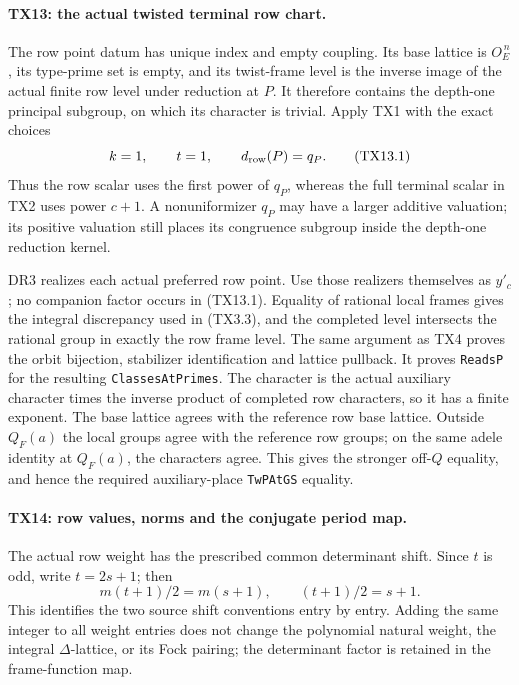 \paragraph{TX13: the actual twisted terminal row chart.}
The row point datum has unique index and empty coupling.
Its base lattice is \(O_E^{\,n}\), its type-prime set is empty,
and its twist-frame level is the inverse image of the actual
finite row level under reduction at \(P\). It therefore
contains the depth-one principal subgroup, on which its
character is trivial. Apply TX1 with the exact choices
\[
 k=1,\qquad t=1,\qquad d_{\rm row}(P)=q_P.
 \tag{TX13.1}
\]
Thus the row scalar uses the first power of \(q_P\), whereas
the full terminal scalar in TX2 uses power \(c+1\). A
nonuniformizer \(q_P\) may have a larger additive valuation;
its positive valuation still places its congruence subgroup
inside the depth-one reduction kernel.

DR3 realizes each actual preferred row point. Use those
realizers themselves as \(y'_c\); no companion factor occurs
in (TX13.1). Equality of rational local frames gives the
integral discrepancy used in (TX3.3), and the completed level
intersects the rational group in exactly the row frame level.
The same argument as TX4 proves the orbit bijection,
stabilizer identification and lattice pullback. It proves
\texttt{ReadsP} for the resulting \texttt{ClassesAtPrimes}.
The character is the actual auxiliary character times the
inverse product of completed row characters, so it has a
finite exponent. The base lattice agrees with the reference
row base lattice. Outside \(Q_F(a)\) the local groups agree
with the reference row groups; on the same adele identity at
\(Q_F(a)\), the characters agree. This gives the stronger
off-\(Q\) equality, and hence the required auxiliary-place
\texttt{TwPAtGS} equality.

\paragraph{TX14: row values, norms and the conjugate period map.}
The actual row weight has the prescribed common determinant
shift. Since \(t\) is odd, write \(t=2s+1\); then
\[
 m(t+1)/2=m(s+1),\qquad (t+1)/2=s+1.
 \tag{TX14.1}
\]
This identifies the two source shift conventions entry by
entry. Adding the same integer to all weight entries does
not change the polynomial natural weight, the integral
\(\Delta\)-lattice, or its Fock pairing; the determinant
factor is retained in the frame-function map.

